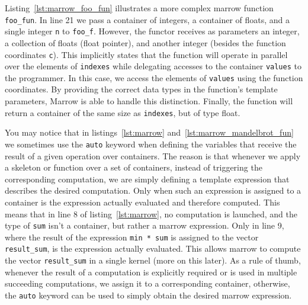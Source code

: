 Listing~\ref{lst:marrow_foo_fun} illustrates a more complex marrow function \texttt{foo\_fun}. In line 21 we pass a container of integers, a container of floats, and a single integer \texttt{n} to \texttt{foo\_f}. However, the functor receives as parameters an integer, a collection of floats (float pointer), and another integer (besides the function coordinates \texttt{c}). This implicitly states that the function will operate in parallel over the elements of \texttt{indexes} while delegating accesses to the container \texttt{values} to the programmer. In this case, we access the elements of \texttt{values} using the function coordinates. By providing the correct data types in the function's template parameters, Marrow is able to handle this distinction. Finally, the function will return a container of the same size as \texttt{indexes}, but of type float.



You may notice that in listings~\ref{lst:marrow} and~\ref{lst:marrow_mandelbrot_fun} we sometimes use the \texttt{auto} keyword when defining the variables that receive the result of a given operation over containers. The reason is that whenever we apply a skeleton or function over a set of containers, instead of triggering the corresponding computation, we are simply defining a template expression that describes the desired computation. Only when such an expression is assigned to a container is the expression actually evaluated and therefore computed. This means that in line 8 of listing~\ref{lst:marrow}, no computation is launched, and the type of \texttt{sum} isn't a container, but rather a marrow expression. Only in line 9, where the result of the expression \texttt{min * sum} is assigned to the vector \texttt{result\_sum}, is the expression actually evaluated. This allows marrow to compute the vector \texttt{result\_sum} in a single kernel (more on this later). As a rule of thumb, whenever the result of a computation is explicitly required or is used in multiple succeeding computations, we assign it to a corresponding container, otherwise, the \texttt{auto} keyword can be used to simply obtain the desired marrow expression. 


